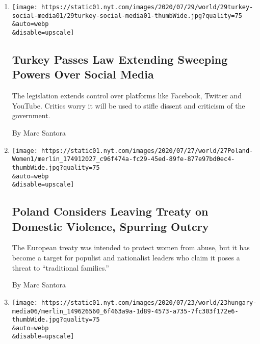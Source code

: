 \begin{enumerate}
\def\labelenumi{\arabic{enumi}.}
\item
  \href{/2020/07/29/world/europe/turkey-social-media-control.html}{}

  \texttt{[image: https://static01.nyt.com/images/2020/07/29/world/29turkey-social-media01/29turkey-social-media01-thumbWide.jpg?quality=75\\\&auto=webp\\\&disable=upscale]}

  \hypertarget{turkey-passes-law-extending-sweeping-powers-over-social-media}{%
  \subsection{Turkey Passes Law Extending Sweeping Powers Over Social
  Media}\label{turkey-passes-law-extending-sweeping-powers-over-social-media}}

  The legislation extends control over platforms like Facebook, Twitter
  and YouTube. Critics worry it will be used to stifle dissent and
  criticism of the government.

  By Marc Santora
\item
  \href{/2020/07/27/world/europe/poland-domestic-violence-treaty.html}{}

  \texttt{[image: https://static01.nyt.com/images/2020/07/27/world/27Poland-Women1/merlin\_174912027\_c96f474a-fc29-45ed-89fe-877e97bd0ec4-thumbWide.jpg?quality=75\\\&auto=webp\\\&disable=upscale]}

  \hypertarget{poland-considers-leaving-treaty-on-domestic-violence-spurring-outcry}{%
  \subsection{Poland Considers Leaving Treaty on Domestic Violence,
  Spurring
  Outcry}\label{poland-considers-leaving-treaty-on-domestic-violence-spurring-outcry}}

  The European treaty was intended to protect women from abuse, but it
  has become a target for populist and nationalist leaders who claim it
  poses a threat to ``traditional families.''

  By Marc Santora
\item
  \href{/2020/07/24/world/europe/hungary-poland-media-freedom-index.html}{}

  \texttt{[image: https://static01.nyt.com/images/2020/07/23/world/23hungary-media06/merlin\_149626560\_6f463a9a-1d89-4573-a735-7fc303f172e6-thumbWide.jpg?quality=75\\\&auto=webp\\\&disable=upscale]}


\end{enumerate}
